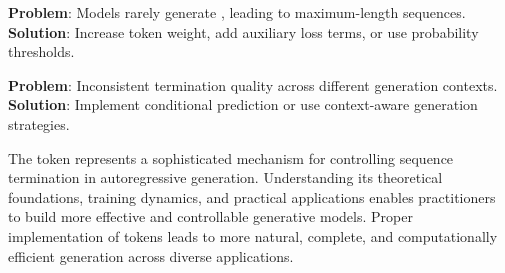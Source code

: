 \textbf{Problem}: Models rarely generate \eos{}, leading to maximum-length sequences.
\textbf{Solution}: Increase \eos{} token weight, add auxiliary loss terms, or use \eos{} probability thresholds.

\textbf{Problem}: Inconsistent termination quality across different generation contexts.
\textbf{Solution}: Implement conditional \eos{} prediction or use context-aware generation strategies.

\begin{comment}
Feedback: Format the above problem-solution list properly. Currently they are single lines.
\end{comment}

The \eos{} token represents a sophisticated mechanism for controlling sequence termination in autoregressive generation. Understanding its theoretical foundations, training dynamics, and practical applications enables practitioners to build more effective and controllable generative models. Proper implementation of \eos{} tokens leads to more natural, complete, and computationally efficient generation across diverse applications.